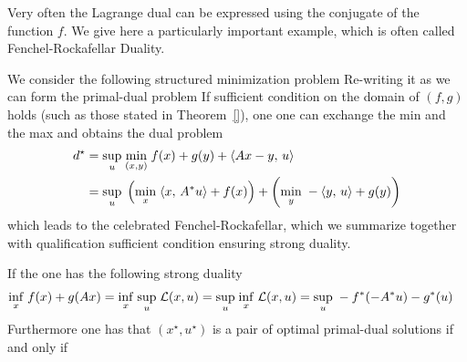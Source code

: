 
Very often the Lagrange dual can be expressed using the conjugate of the function $f$. We give here a particularly important example, which is often called Fenchel-Rockafellar Duality. 

We consider the following structured minimization problem
Re-writing it as 
we can form the primal-dual problem
If sufficient condition on the domain of $(f,g)$ holds (such as those stated in Theorem~\ref{}), one one can exchange the min and the max and obtains the dual problem
\begin{align}\label{eq-deriv-rock-fench}
	d^\star &= \underset{u}{\sup}\; \underset{(x,y)}{\min}\; f(x) + g(y) + \langle Ax-y,\,u\rangle \\
	&= \underset{u}{\sup}\; \left(  \underset{x}{\min}\; \langle x,\,A^* u\rangle + f(x)  \right) + \left(  \underset{y}{\min}\; -\langle y,\,u\rangle + g(y)  \right) 
\end{align}
which leads to the celebrated Fenchel-Rockafellar, which we summarize together with qualification sufficient condition ensuring strong duality.

\begin{thm}\label{thm-fenchel-Rockafellar}
If 
the one has the following strong duality
\begin{align}\label{eq-fenchel-Rockafellar}
	\underset{x}{\inf}\; f(x) + g(Ax) &= \underset{x}{\inf}\; \underset{u}{\sup}\; \mathcal{L}(x,u) 
	= \underset{u}{\sup}\; \underset{x}{\inf}\;\mathcal{L}(x,u)  
	= \underset{u}{\sup}\; - f^*(-A^*u) - g^*(u)
\end{align}
Furthermore one has that $(x^\star,u^\star)$ is a pair of optimal primal-dual solutions if and only if
\end{thm}

